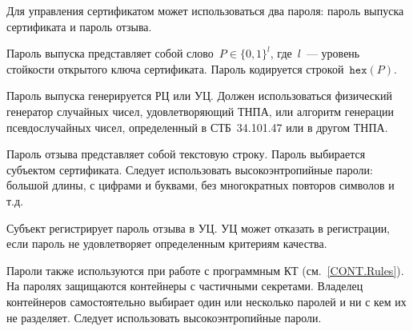 Для управления сертификатом может использоваться два пароля:
пароль выпуска сертификата и пароль отзыва. 

Пароль выпуска представляет собой слово~$P\in\{0,1\}^l$,
где~$l$~--- уровень стойкости открытого ключа сертификата.
%
Пароль кодируется строкой~$\texttt{hex}(P)$.

Пароль выпуска генерируется РЦ или УЦ. Должен использоваться физический 
генератор случайных чисел, удовлетворяющий ТНПА, или алгоритм генерации 
псевдослучайных чисел, определенный в СТБ~34.101.47 или в другом ТНПА.

Пароль отзыва представляет собой текстовую строку.
%
Пароль выбирается субъектом сертификата. Следует использовать 
высокоэнтропийные пароли: большой длины, с цифрами и буквами, 
без многократных повторов символов и т.д.

Субъект регистрирует пароль отзыва в УЦ. УЦ может отказать в регистрации, 
если пароль не удовлетворяет определенным критериям качества. 

Пароли также используются при работе с программным КТ 
(см.~\ref{CONT.Rules}). На паролях защищаются контейнеры с частичными  
секретами. Владелец контейнеров самостоятельно выбирает один или несколько
паролей и ни с кем их не разделяет. Следует использовать высокоэнтропийные 
пароли.  


